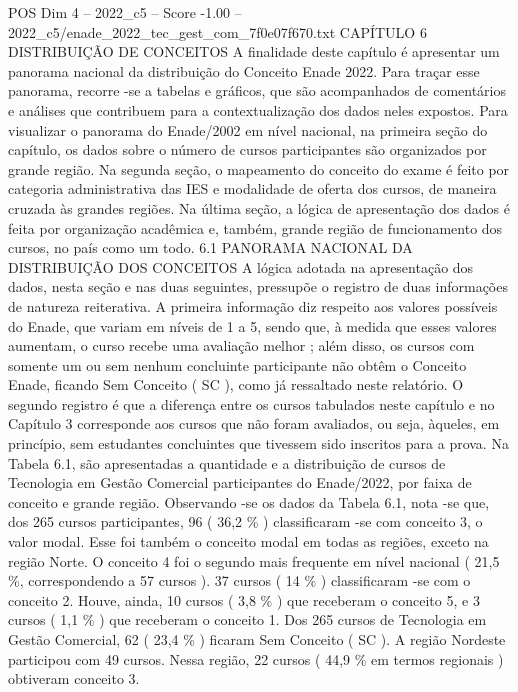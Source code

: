 \begin{textsample}{POS Dim 4 – 2022\_c5 – Score -1.00 – 2022\_c5/enade\_2022\_tec\_gest\_com\_7f0e07f670.txt}  \label{ex:f4_pos_287}
CAPÍTULO 6 DISTRIBUIÇÃO DE CONCEITOS A finalidade deste capítulo é apresentar um panorama nacional da distribuição do Conceito Enade 2022.
Para traçar esse panorama, recorre -se a tabelas e gráficos, que são acompanhados de comentários e análises que contribuem para a contextualização dos dados neles expostos.
Para visualizar o panorama do Enade/2002 em nível nacional, na primeira seção do capítulo, os dados sobre o número de cursos participantes são organizados por grande região.
Na segunda seção, o mapeamento do conceito do exame é feito por categoria administrativa das IES e modalidade de oferta dos cursos, de maneira cruzada às grandes regiões.
Na última seção, a lógica de apresentação dos dados é feita por organização acadêmica e, também, grande região de funcionamento dos cursos, no país como um todo. 6.1 PANORAMA NACIONAL DA DISTRIBUIÇÃO DOS CONCEITOS A lógica adotada na apresentação dos dados, nesta seção e nas duas seguintes, pressupõe o registro de duas informações de natureza reiterativa.
A primeira informação diz respeito aos valores possíveis do Enade, que variam em níveis de 1 a 5, sendo que, à medida que esses valores aumentam, o curso recebe uma avaliação melhor ; além disso, os cursos com somente um ou sem nenhum concluinte participante não obtêm o Conceito Enade, ficando Sem Conceito ( SC ), como já ressaltado neste relatório.
O segundo registro é que a diferença entre os cursos tabulados neste capítulo e no Capítulo 3 corresponde aos cursos que não foram avaliados, ou seja, àqueles, em princípio, sem estudantes concluintes que tivessem sido inscritos para a prova.
Na Tabela 6.1, são apresentadas a quantidade e a distribuição de cursos de Tecnologia em Gestão Comercial participantes do Enade/2022, por faixa de conceito e grande região.
Observando -se os dados da Tabela 6.1, nota -se que, dos 265 cursos participantes, 96 ( 36,2 \% ) classificaram -se com conceito 3, o valor modal.
Esse foi também o conceito modal em todas as regiões, exceto na região Norte.
O conceito 4 foi o segundo mais frequente em nível nacional ( 21,5 \%, correspondendo a 57 cursos ). 37 cursos ( 14 \% ) classificaram -se com o conceito 2.
Houve, ainda, 10 cursos ( 3,8 \% ) que receberam o conceito 5, e 3 cursos ( 1,1 \% ) que receberam o conceito 1.
Dos 265 cursos de Tecnologia em Gestão Comercial, 62 ( 23,4 \% ) ficaram Sem Conceito ( SC ).
A região Nordeste participou com 49 cursos.
Nessa região, 22 cursos ( 44,9 \% em termos regionais ) obtiveram conceito 3.

\end{textsample}
